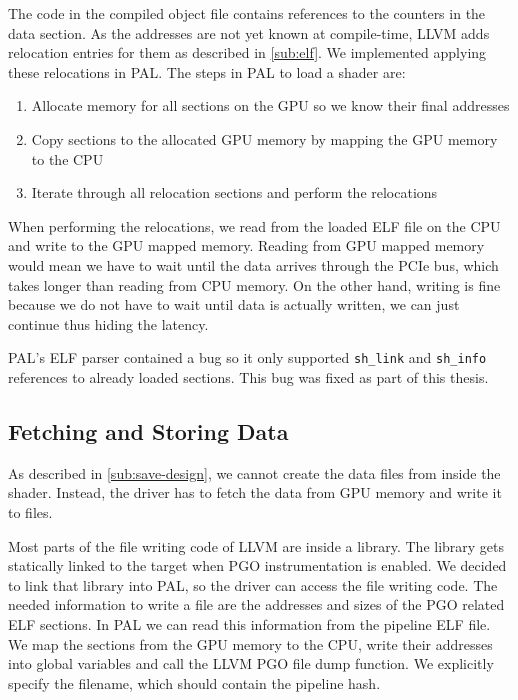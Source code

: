 The code in the compiled object file contains references to the counters in the data section. As the addresses are not yet known at compile-time, LLVM adds relocation entries for them as described in \cref{sub:elf}. We implemented applying these relocations in PAL. The steps in PAL to load a shader are:
\begin{enumerate}
	\item Allocate memory for all sections on the GPU so we know their final addresses
	\item Copy sections to the allocated GPU memory by mapping the GPU memory to the CPU
	\item Iterate through all relocation sections and perform the relocations
\end{enumerate}
When performing the relocations, we read from the loaded ELF file on the CPU and write to the GPU mapped memory. Reading from GPU mapped memory would mean we have to wait until the data arrives through the PCIe bus, which takes longer than reading from CPU memory. On the other hand, writing is fine because we do not have to wait until data is actually written, we can just continue thus hiding the latency.

PAL's ELF parser contained a bug so it only supported \texttt{sh\_link} and \texttt{sh\_info} references to already loaded sections. This bug was fixed as part of this thesis.


\subsection{Fetching and Storing Data}
\label{sub:save}
As described in \cref{sub:save-design}, we cannot create the data files from inside the shader. Instead, the driver has to fetch the data from GPU memory and write it to files.

Most parts of the file writing code of LLVM are inside a library. The library gets statically linked to the target when PGO instrumentation is enabled. We decided to link that library into PAL, so the driver can access the file writing code.
The needed information to write a file are the addresses and sizes of the PGO related ELF sections. In PAL we can read this information from the pipeline ELF file. We map the sections from the GPU memory to the CPU, write their addresses into global variables and call the LLVM PGO file dump function.
We explicitly specify the filename, which should contain the pipeline hash.

